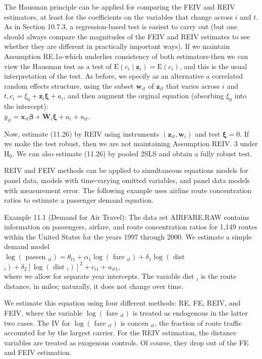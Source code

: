 \documentclass[10pt]{article}
\begin{document}
The Hausman principle can be applied for comparing the FEIV and REIV estimators, at least for the coefficients on the variables that change across $i$ and $t$. As in Section 10.7.3, a regression-based test is easiest to carry out (but one should always compare the magnitudes of the FEIV and REIV estimates to see whether they are different in practically important ways). If we maintain Assumption RE.1a-which underlies consistency of both estimators-then we can view the Hausman test as a test of $\mathrm{E}\left(c_{i} \mid \mathbf{z}_{i}\right)=\mathrm{E}\left(c_{i}\right)$, and this is the usual interpretation of the test. As before, we specify as an alternative a correlated random effects structure, using the subset $\mathbf{w}_{i t}$ of $\mathbf{z}_{i t}$ that varies across $i$ and $t, c_{i}=\xi_{0}+\overline{\mathbf{z}}_{i} \boldsymbol{\xi}+a_{i}$, and then augment the orginal equation (absorbing $\xi_{0}$ into the intercept):\\
$y_{i t}=\mathbf{x}_{i t} \boldsymbol{\beta}+\overline{\mathbf{W}}_{i} \boldsymbol{\xi}+a_{i}+u_{i t}$.

Now, estimate (11.26) by REIV using instruments $\left(\mathbf{z}_{i t}, \overline{\mathbf{w}}_{i}\right)$ and test $\boldsymbol{\xi}=0$. If we make the test robust, then we are not maintaining Assumption REIV. 3 under $\mathrm{H}_{0}$. We can also estimate (11.26) by pooled 2SLS and obtain a fully robust test.

REIV and FEIV methods can be applied to simultaneous equations models for panel data, models with time-varying omitted variables, and panel data models with measurement error. The following example uses airline route concentration ratios to estimate a passenger demand equation.

Example 11.1 (Demand for Air Travel): The data set AIRFARE.RAW contains information on passengers, airfare, and route concentration ratios for 1,149 routes within the United States for the years 1997 through 2000. We estimate a simple demand model\\
$\log \left(\right.$ passen $\left._{i t}\right)=\theta_{t 1}+\alpha_{1} \log \left(\right.$ fare $\left._{i t}\right)+\delta_{1} \log \left(\right.$ dist $\left._{i}\right)+\delta_{2}\left[\log \left(\text { dist }_{i}\right)\right]^{2}+c_{i 1}+u_{i t 1}$,\\
where we allow for separate year intercepts. The variable dist $_{i}$ is the route distance, in miles; naturally, it does not change over time.

We estimate this equation using four different methods: RE, FE, REIV, and FEIV, where the variable $\log \left(\right.$ fare $\left._{i t}\right)$ is treated as endogenous in the latter two cases. The IV for $\log \left(\right.$ fare $\left._{i t}\right)$ is concen $_{i t}$, the fraction of route traffic accounted for by the largest carrier. For the REIV estimation, the distance variables are treated as exogenous controls. Of course, they drop out of the FE and FEIV estimation.
\end{document}
